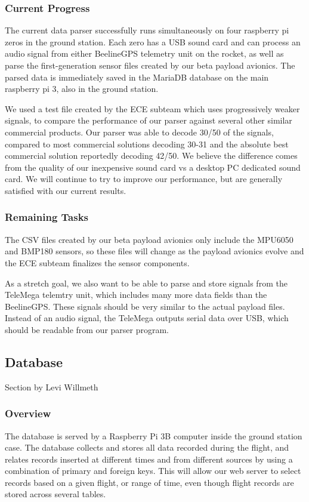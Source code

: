 \documentclass[onecolumn, draftclsnofoot, 10pt, compsoc]{IEEEtran}
\begin{document}
\subsubsection{Current Progress}
The current data parser successfully runs simultaneously on four raspberry pi zeros in the ground station.  Each zero has a USB sound card and can process an audio signal from either BeelineGPS telemetry unit on the rocket, as well as parse the first-generation sensor files created by our beta payload avionics.  The parsed data is immediately saved in the MariaDB database on the main raspberry pi 3, also in the ground station.

We used a test file created by the ECE subteam which uses progressively weaker signals, to compare the performance of our parser against several other similar commercial products.  Our parser was able to decode 30/50 of the signals, compared to most commercial solutions decoding 30-31 and the absolute best commercial solution reportedly decoding 42/50.  We believe the difference comes from the quality of our inexpensive sound card vs a desktop PC dedicated sound card. We will continue to try to improve our performance, but are generally satisfied with our current results.

\subsubsection{Remaining Tasks}
The CSV files created by our beta payload avionics only include the MPU6050 and BMP180 sensors, so these files will change as the payload avionics evolve and the ECE subteam finalizes the sensor components.

As a stretch goal, we also want to be able to parse and store signals from the TeleMega telemtry unit, which includes many more data fields than the BeelineGPS.  These signals should be very similar to the actual payload files.  Instead of an audio signal, the TeleMega outputs serial data over USB, which should be readable from our parser program.


\subsection{Database}
Section by Levi Willmeth

\subsubsection{Overview}
The database is served by a Raspberry Pi 3B computer inside the ground station case.  The database collects and stores all data recorded during the flight, and relates records inserted at different times and from different sources by using a combination of primary and foreign keys. This will allow our web server to select records based on a given flight, or range of time, even though flight records are stored across several tables.
\end{document}
